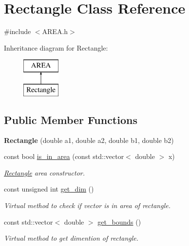 \hypertarget{class_rectangle}{}\section{Rectangle Class Reference}
\label{class_rectangle}


{\ttfamily \#include $<$A\+R\+E\+A.\+h$>$}

Inheritance diagram for Rectangle\+:\begin{figure}[H]
\begin{center}
\leavevmode
\includegraphics[height=2.000000cm]{class_rectangle}
\end{center}
\end{figure}
\subsection*{Public Member Functions}
\begin{DoxyCompactItemize}
\item 
\mbox{\label{class_rectangle_a53b752170e408da7f54037f92f6fbf1b}} 
{\bfseries Rectangle} (double a1, double a2, double b1, double b2)
\item 
\mbox{\label{class_rectangle_a1441ece4619a41086d4fd9210d8936e8}} 
const bool \hyperlink{class_rectangle_a1441ece4619a41086d4fd9210d8936e8}{is\+\_\+in\+\_\+area} (const std\+::vector$<$ double $>$ x)
\begin{DoxyCompactList}\small\item\em \hyperlink{class_rectangle}{Rectangle} area constructor. \end{DoxyCompactList}\item 
\mbox{\label{class_rectangle_ab76d97c703e0d99dd625f8f8b43c683a}} 
const unsigned int \hyperlink{class_rectangle_ab76d97c703e0d99dd625f8f8b43c683a}{get\+\_\+dim} ()
\begin{DoxyCompactList}\small\item\em Virtual method to check if vector is in area of rectangle. \end{DoxyCompactList}\item 
\mbox{\label{class_rectangle_a39c267d74f3c82689f2e22b8206afd35}} 
const std\+::vector$<$ double $>$ \hyperlink{class_rectangle_a39c267d74f3c82689f2e22b8206afd35}{get\+\_\+bounds} ()
\begin{DoxyCompactList}\small\item\em Virtual method to get dimention of rectangle. \end{DoxyCompactList}\end{DoxyCompactItemize}
